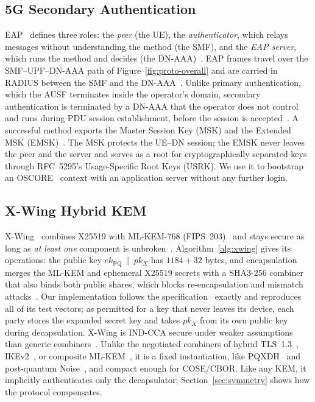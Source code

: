 \documentclass[symmetry,article,submit,moreauthors]{Definitions/mdpi}
\begin{document}
\subsection{5G Secondary Authentication}
\label{sec:prelim-secondary-auth}
EAP~\cite{RFC3748} defines three roles: the \emph{peer} (the UE), the \emph{authenticator}, which relays messages without understanding the method (the SMF), and the \emph{EAP server}, which runs the method and decides (the DN-AAA)~\cite{TS33501,TS23501}. EAP frames travel over the SMF--UPF--DN-AAA path of Figure~\ref{fig:proto-overall} and are carried in RADIUS between the SMF and the DN-AAA~\cite{RFC2865,RFC3579}. Unlike primary authentication, which the AUSF terminates inside the operator's domain, secondary authentication is terminated by a DN-AAA that the operator does not control and runs during PDU session establishment, before the session is accepted~\cite{TS33501,TS23502}. A successful method exports the Master Session Key (MSK) and the Extended MSK (EMSK)~\cite{RFC3748,RFC5295}. The MSK protects the UE--DN session; the EMSK never leaves the peer and the server and serves as a root for cryptographically separated keys through RFC~5295's Usage-Specific Root Keys (USRK). We use it to bootstrap an OSCORE~\cite{RFC8613} context with an application server without any further login.

\subsection{X-Wing Hybrid KEM}
\label{sec:prelim-xwing}
X-Wing~\cite{XWing,XWingDraft} combines X25519 with ML-KEM-768 (FIPS~203)~\cite{FIPS203,CRYSTALS} and stays secure as long as \emph{at least one} component is unbroken~\cite{PQUIP,BBF+19,TS103744}. Algorithm~\ref{alg:xwing} gives its operations: the public key $ek_{\mathrm{PQ}}\,\|\,pk_X$ has $1184+32$ bytes, and encapsulation merges the ML-KEM and ephemeral X25519 secrets with a SHA3-256 combiner that also binds both public shares, which blocks re-encapsulation and mismatch attacks~\cite{CDM24,ADH+22}. Our implementation follows the specification~\cite{XWingDraft} exactly and reproduces all of its test vectors; as permitted for a key that never leaves its device, each party stores the expanded secret key and takes $pk_X$ from its own public key during decapsulation. X-Wing is IND-CCA secure under weaker assumptions than generic combiners~\cite{XWing}. Unlike the negotiated combiners of hybrid TLS~1.3~\cite{TLS,RFC10024}, IKEv2~\cite{RFC9370}, or composite ML-KEM~\cite{LAMPS,BBF+19}, it is a fixed instantiation, like PQXDH~\cite{PQXDH,FG24} and post-quantum Noise~\cite{ADH+22}, and compact enough for COSE/CBOR. Like any KEM, it implicitly authenticates only the decapsulator; Section~\ref{sec:symmetry} shows how the protocol compensates.
\end{document}
